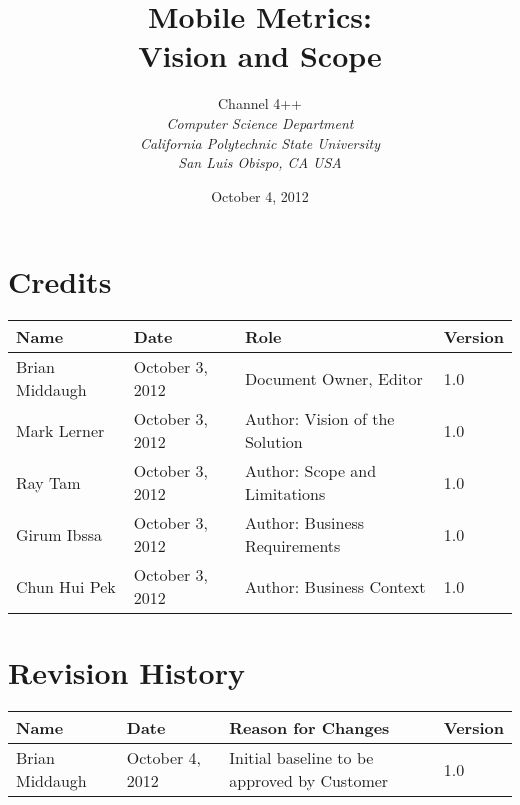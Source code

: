 \documentclass[12pt,oneside,letterpaper]{article}
\begin{document}
\setlength{\parindent}{0pt}
\title{\bfseries Mobile Metrics: \\Vision and Scope}

\author {
\large{Channel 4++}\\
\emph{Computer Science Department}\\
\emph{California Polytechnic State University}\\
\emph{San Luis Obispo, CA USA}\\
}

\date{October 4, 2012}
\maketitle \thispagestyle{empty}

\pagebreak
\tableofcontents


\section*{Credits}
\begin{tabular}{|l|l|p{2.5in}|l|}
\hline
\textbf{Name}&\textbf{Date}&\textbf{Role}&\textbf{Version}\\
\hline
Brian Middaugh&October 3, 2012&Document Owner, Editor&1.0\\
\hline
Mark Lerner&October 3, 2012&Author: Vision of the Solution&1.0\\
\hline
Ray Tam&October 3, 2012&Author: Scope and Limitations&1.0\\
\hline
Girum Ibssa&October 3, 2012&Author: Business Requirements&1.0\\
\hline
Chun Hui Pek&October 3, 2012&Author: Business Context&1.0\\
\hline
\end{tabular}


\section*{Revision History}
\begin{tabular}{|l|l|p{2.5in}|l|}
\hline
\textbf{Name}&\textbf{Date}&\textbf{Reason for Changes}&\textbf{Version}\\
\hline
Brian Middaugh&October 4, 2012&Initial baseline to be approved by Customer&1.0\\
\hline
\end{tabular}
\end{document}
